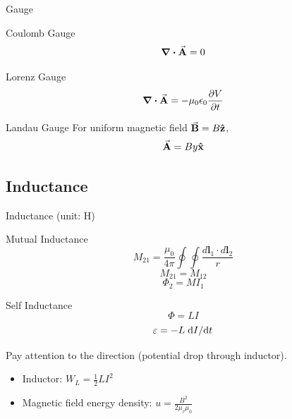 \documentclass{beamer}
\begin{document}
\begin{frame}{Gauge}
    \begin{block}{Coulomb Gauge}
        \begin{equation*}
            \div\va{A} = 0
        \end{equation*}
    \end{block}

    \begin{block}{Lorenz Gauge}
        \begin{equation*}
            \div \va{A} = -\mu_0\epsilon_0\pdv{V}{t}
        \end{equation*}
    \end{block}

    \begin{block}{Landau Gauge}
        For uniform magnetic field $\va{B} = B \vu{z}$,
        \begin{equation*}
            \va{A} = By \vu{x}
        \end{equation*}
    \end{block}
\end{frame}

\subsection{Inductance}

\begin{frame}{Inductance (unit: H)}
    \begin{block}{Mutual Inductance}
        \begin{equation}
            M_{21}=\frac{\mu_{0}}{4 \pi} \oint \oint \frac{d \mathbf{l}_{1} \cdot d \mathbf{l}_{2}}{r}
        \end{equation}
        \begin{equation}
            M_{21} = M_{12}
        \end{equation}
        \begin{equation}
            \Phi_2 = M I_1
        \end{equation}
    \end{block}

    \begin{block}{Self Inductance}
        \begin{equation}
            \Phi = L I
        \end{equation}
        \begin{equation}
            \varepsilon = - L \dv*{I}{t}
        \end{equation}

        Pay attention to the direction (potential drop through inductor).
    \end{block}

    \begin{itemize}
        \item Inductor: $W_L = \frac{1}{2} L I^2$
        \item Magnetic field energy density: $u = \frac{B^2}{2 \mu_r\mu_0}$
    \end{itemize}
\end{frame}
\end{document}
